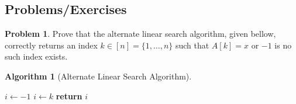 \documentclass{article}
\theoremstyle{plain}
\theoremstyle{definition}
\newtheorem{problem}{Problem}[section]
\newtheorem*{algorithm*}{Algorithm}\newtheorem{manualprobleminner}{Problem}
\begin{document}
\subsection{Problems/Exercises}

\begin{problem}
    Prove that the alternate linear search algorithm, given bellow, correctly returns an index \(k \in [n] = \{1,\dotsc,n\}\) such that \(A[k] = x\) or \(-1\) is no such index exists. 

    \begin{algorithm*}[Alternate Linear Search Algorithm] \phantom{}%
        \begin{center}
        \begin{minipage}{.5\linewidth}
        \begin{algorithmic}[1]
                \State \(i \leftarrow -1\)
                        \State \(i \leftarrow k\)
                    \EndIf
                \EndFor
                \State \textbf{return} \(i\)
            \EndProcedure
        \end{algorithmic}
        \end{minipage}
        \end{center}
        \end{algorithm*}
\end{problem}
\end{document}

